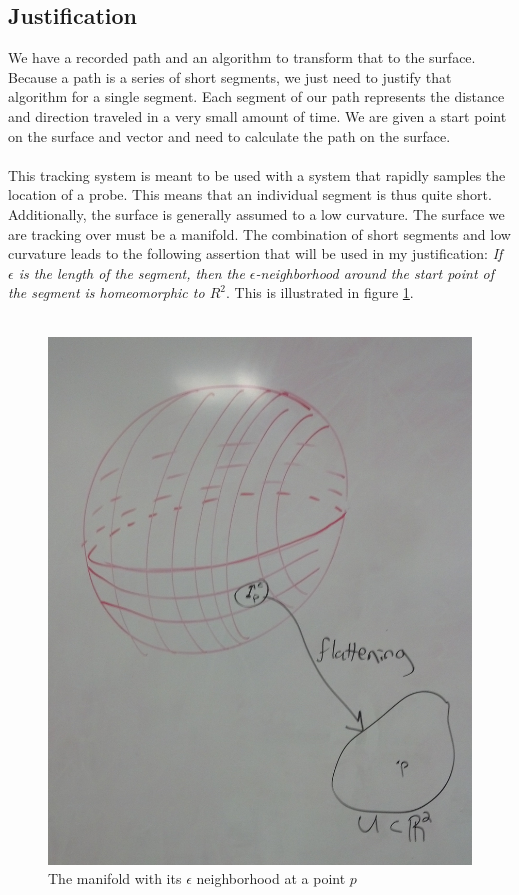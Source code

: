 \documentclass[conference]{acmsiggraph}
\begin{document}
\subsection{Justification}

We have a recorded path and an algorithm to transform that to the surface. Because a path is a series of short segments, we just need to justify that algorithm for a single segment. Each segment of our path represents the distance and direction traveled in a very small amount of time. We are given a start point on the surface and vector and need to calculate the path on the surface. \\
\\
This tracking system is meant to be used with a system that rapidly samples the location of a probe. This means that an individual segment is thus quite short. Additionally, the surface is generally assumed to a low curvature. The surface we are tracking over must be a manifold. The combination of short segments and low curvature leads to the following assertion that will be used in my justification: {\it If $\epsilon$ is the length of the segment, then the $\epsilon$-neighborhood around the start point of the segment is homeomorphic to $R^2$}. This is illustrated in figure \ref{manifolddiagram}.\\
\\
\begin{figure}[ht]
\centering
\includegraphics[width=\columnwidth]{manifolddiagram.jpg}
\caption{The manifold with its $\epsilon$ neighborhood at a point $p$}
\label{manifolddiagram}
\end{figure}
\end{document}
